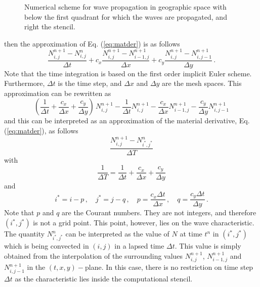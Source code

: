 \documentclass[12pt]{book}
\begin{document}
\begin{figure}[htb]
   \centerline{
              }
      \caption{Numerical scheme for wave propagation in geographic space with below the first quadrant for which the waves are propagated, and right the stencil.}
      \label{fig:fsweep2}
\end{figure}
then the approximation of Eq. (\ref{eq:matder}) is as follows
\begin{equation}
 \frac{N^{n+1}_{i,j}-N^n_{i,j}}{\Delta t} + c_x \frac{N^{n+1}_{i,j} - N^{n+1}_{i-1,j}}{\Delta x} + c_y \frac{N^{n+1}_{i,j} - N^{n+1}_{i,j-1}}{\Delta y} \, .
\end{equation}
Note that the time integration is based on the first order implicit Euler scheme. Furthermore, $\Delta t$ is the time step, and $\Delta x$ and $\Delta y$ are the mesh spaces. This approximation can be rewritten as
\begin{equation}
  \left ( \frac{1}{\Delta t} + \frac{c_x}{\Delta x} + \frac{c_y}{\Delta y} \right )\, N^{n+1}_{i,j} - \frac{1}{\Delta t}N^{n+1}_{i,j} - \frac{c_x}{\Delta x} N^{n+1}_{i-1,j} - \frac{c_y}{\Delta y} N^{n+1}_{i,j-1}
\end{equation}
and this can be interpreted as an approximation of the material derivative, Eq. (\ref{eq:matder}), as follows
\begin{equation}
  \frac{N^{n+1}_{i,j} - N^{n}_{i^*,j^*}}{\Delta T}
\end{equation}
with
\begin{equation}
  \frac{1}{\Delta T} = \frac{1}{\Delta t} + \frac{c_x}{\Delta x} + \frac{c_y}{\Delta y}
\end{equation}
and
\begin{equation}
  i^* = i - p\, , \quad j^* = j - q\, , \quad p = \frac{c_x \Delta t}{\Delta x}\, , \quad q = \frac{c_y \Delta t}{\Delta y}\, .
\end{equation}
Note that $p$ and $q$ are the Courant numbers. They are not integers, and therefore $(i^*,j^*)$ is not a grid point. This point, however, lies on the wave characteristic. The quantity $N^{n}_{i^*,j^*}$ can be
interpreted as the value of $N$ at time $t^n$ in $(i^*,j^*)$ which is being convected in $(i,j)$ in a lapsed time $\Delta t$. This value is simply obtained from the interpolation of the surrounding values
$N^{n+1}_{i,j}$, $N^{n+1}_{i-1,j}$ and $N^{n+1}_{i,j-1}$ in the $(t,x,y)-$plane. In this case, there is no restriction on time step $\Delta t$ as the characteristic lies inside the computational stencil.
\\[2ex]
\end{document}
